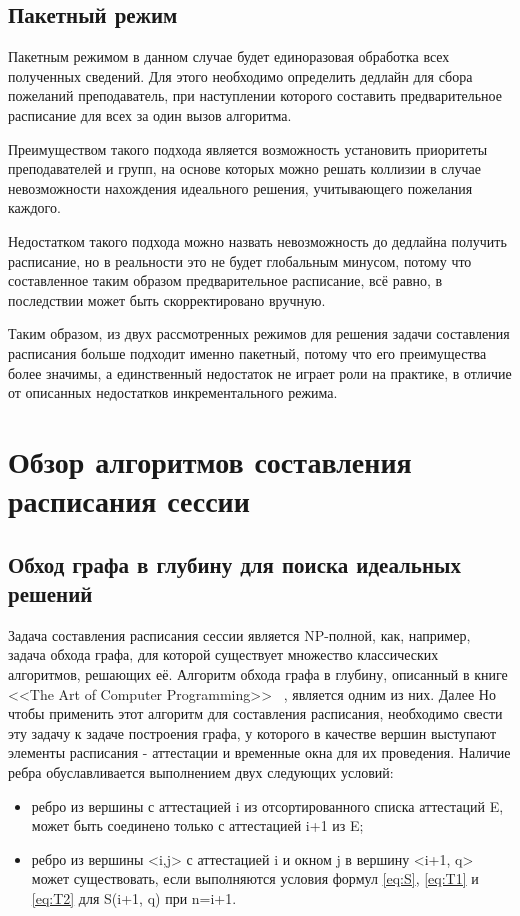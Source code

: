 \subsection{Пакетный режим}

Пакетным режимом в данном случае будет единоразовая обработка всех полученных сведений. Для этого необходимо определить дедлайн для сбора пожеланий преподаватель, при наступлении которого составить предварительное расписание для всех за один вызов алгоритма. 

Преимуществом такого подхода является возможность установить приоритеты преподавателей и групп, на основе которых можно решать коллизии в случае невозможности нахождения идеального решения, учитывающего пожелания каждого. 

Недостатком такого подхода можно назвать невозможность до дедлайна получить расписание, но в реальности это не будет глобальным минусом, потому что составленное таким образом предварительное расписание, всё равно, в последствии может быть скорректировано вручную. 

Таким образом, из двух рассмотренных режимов для решения задачи составления расписания больше подходит именно пакетный, потому что его преимущества более значимы, а единственный недостаток не играет роли на практике, в отличие от описанных недостатков инкрементального режима.

\section{Обзор алгоритмов составления расписания сессии} \label{ch2:sec3} 
\subsection{Обход графа в глубину для поиска идеальных решений}

Задача составления расписания сессии является NP-полной, как, например, задача обхода графа, для которой существует множество классических алгоритмов, решающих её. Алгоритм обхода графа в глубину, описанный в книге <<The Art of Computer Programming>> ~\cite{dfs}, является одним из них. Далее Но чтобы применить этот алгоритм для составления расписания, необходимо свести эту задачу к задаче построения графа, у которого в качестве вершин выступают элементы расписания - аттестации и временные окна для их проведения. Наличие ребра обуславливается выполнением двух следующих условий:
\begin{itemize}
	\item ребро из вершины с аттестацией i из отсортированного списка аттестаций E, может быть соединено только с аттестацией i+1 из E;
	\item ребро из вершины <i,j> с аттестацией i и окном j в вершину <i+1, q> может существовать, если выполняются условия формул \eqref{eq:S}, \eqref{eq:T1} и \eqref{eq:T2} для S(i+1, q) при n=i+1.
\end{itemize}

